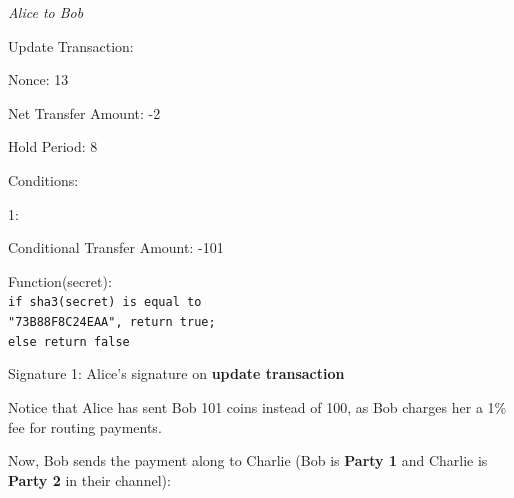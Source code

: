 \documentclass[a4paper]{article}
\newcommand{\bgls}[1]{\textbf{\gls{#1}}}
\newenvironment{mydescription}
{\begin{description}
\setlength{\itemsep}{5pt}
  \setlength{\parskip}{0pt}
  \setlength{\labelsep}{5pt}
}{
\end{description}}
\begin{document}
\begin{mdframed}[style=message]{\emph{Alice to Bob}}
\begin{mydescription}
\item[Update Transaction:] \hfill
\begin{mydescription}
  \item[Nonce:] 13
  \item[Net Transfer Amount:] -2
  \item[Hold Period:] 8
  \item[Conditions:] \hfill
  \begin{mydescription}
    \item[1:] \hfill
    \begin{mydescription}
      \item[Conditional Transfer Amount:] -101
      \item[Function(secret):] \texttt{\\ if sha3(secret) is equal to\\ "73B88F8C24EAA", return true;\\ else return false}
    \end{mydescription}
  \end{mydescription}
\end{mydescription}
\item[Signature 1:] Alice's signature on \bgls{update transaction}
\end{mydescription}
\end{mdframed}

Notice that Alice has sent Bob 101 coins instead of 100, as Bob charges her a 1\% fee for routing payments.

Now, Bob sends the payment along to Charlie (Bob is \textbf{Party 1} and Charlie is \textbf{Party 2} in their channel):
\end{document}
